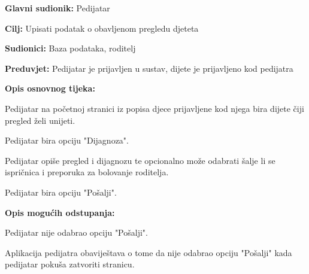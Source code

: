 					\noindent {}
					\begin{packed_item}
						
						\item \textbf{Glavni sudionik: }Pedijatar
						\item  \textbf{Cilj:} Upisati podatak o obavljenom pregledu djeteta
						\item  \textbf{Sudionici:} Baza podataka, roditelj
						\item  \textbf{Preduvjet:} Pedijatar je prijavljen u sustav, dijete je prijavljeno kod pedijatra
						\item  \textbf{Opis osnovnog tijeka:}
						
						\item[] \begin{packed_enum}
							
							\item Pedijatar na početnoj stranici iz popisa djece prijavljene kod njega bira dijete čiji pregled želi unijeti.
							\item Pedijatar bira opciju "Dijagnoza".
							\item Pedijatar opiše pregled i dijagnozu te opcionalno može odabrati šalje li se ispričnica i preporuka za bolovanje roditelja.
							\item Pedijatar bira opciju "Pošalji".
						\end{packed_enum}
						
						\item  \textbf{Opis mogućih odstupanja:}
						
						\item[] \begin{packed_item}
							
							\item[4.a] Pedijatar nije odabrao opciju "Pošalji".
							\item[] \begin{packed_enum}
								
								\item Aplikacija pedijatra obaviještava o tome da nije odabrao opciju "Pošalji" kada pedijatar pokuša zatvoriti stranicu.
							\end{packed_enum}
							
							
						\end{packed_item}
						
						
					\end{packed_item}
					
